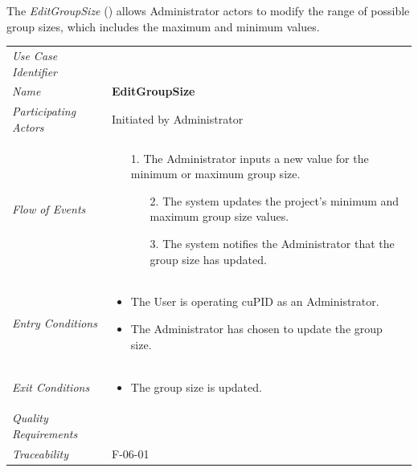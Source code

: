 \documentclass[12pt,letterpaper]{article}
\begin{document}
\vspace{1em}
The {\it EditGroupSize} () allows Administrator actors to modify the range of possible group sizes, which includes the maximum and minimum values.

\begin{center}
	\begin{tabu} to 
		\toprule
		Use Case Identifier &  \\
		Name & {\bf EditGroupSize} \\
		Participating Actors & Initiated by Administrator \\
		Flow of Events & 
		\begin{minipage}[t]{\linewidth}
		    \begin{enumerate}
			    \item[1.] The Administrator inputs a new value for the minimum or maximum group size.
			    \begin{enumerate}
			        \item[2.] The system updates the project's minimum and maximum group size values.
			        \item[3.] The system notifies the Administrator that the group size has updated.
			    \end{enumerate}
			\end{enumerate}
		\end{minipage} \\

		Entry Conditions &
		\begin{minipage}[t]{\linewidth}
			\begin{itemize}
			    \item The User is operating cuPID as an Administrator.
			    \item The Administrator has chosen to update the group size.
	        \end{itemize}
		\end{minipage} \\

		Exit Conditions &
		\begin{minipage}[t]{\linewidth}
			\begin{itemize}
			    \item The group size is updated.
	        \end{itemize}
		\end{minipage} \\

		Quality Requirements & \\

		Traceability & F-06-01 \\
		\toprule
	\end{tabu}
\end{center}
\end{document}
